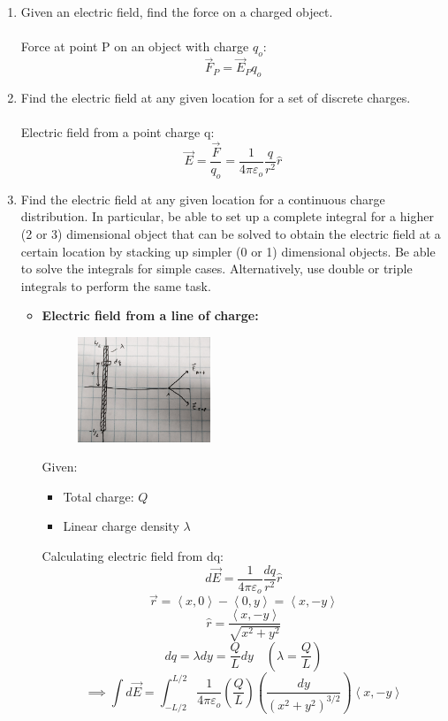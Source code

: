 \documentclass[12pt]{article}
\begin{document}
\begin{enumerate}
\begin{figure}[H]
\end{figure}
    \item Given an electric field, find the force on a charged object.\\\\
    Force at point P on an object with charge $q_o$:
    \[\vec{F}_P=\vec{E}_Pq_o\]
    \item Find the electric field at any given location for a set of discrete charges.\\\\
    Electric field from a point charge q:
    \[\vec{E}=\frac{\vec{F}}{q_o}=\frac{1}{4\pi\varepsilon_o}\frac{q}{r^2}\hat{r}\]
    \item Find the electric field at any given location for a continuous charge distribution. In particular, be able to set up a complete integral for a higher (2 or 3) dimensional object that can be solved to obtain the electric field at a certain location by stacking up simpler (0 or 1) dimensional objects. Be able to solve the integrals for simple cases. Alternatively, use double or triple integrals to perform the same task.
    \begin{itemize}
        \item \textbf{Electric field from a line of charge:}
        \begin{figure}[H]
            \centering
            \includegraphics[width=0.4\textwidth]{line.jpg}
        \end{figure}
        Given:
        \begin{itemize}
            \item Total charge: $Q$
            \item Linear charge density $\lambda$
        \end{itemize}
        Calculating electric field from dq:
\[d\vec{E}=\frac{1}{4\pi\varepsilon_o}\frac{dq}{r^2}\hat{r}\]
\[\vec{r}=\left<x,0\right>-\left<0,y\right>=\left<x,-y\right>\]
\[\hat{r}=\frac{\left<x,-y\right>}{\sqrt{x^2+y^2}}\]
\[dq=\lambda dy=\frac{Q}{L}dy \quad \left(\lambda=\frac{Q}{L}\right)\]
\[\implies \int d\vec{E}=\int_{-L/2}^{L/2}\frac{1}{4\pi\varepsilon_o}\left(\frac{Q}{L}\right)\left(\frac{dy}{(x^2+y^2)^{3/2}}\right)\left<x,-y\right>\]

\end{itemize}
\end{enumerate}
\end{document}
